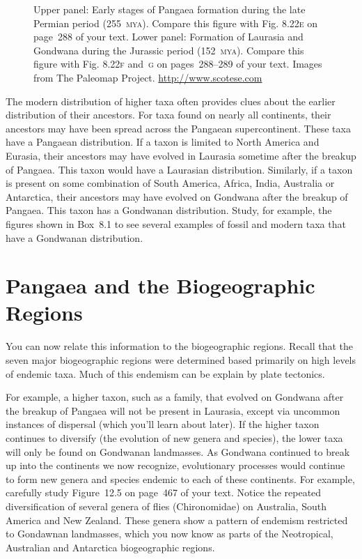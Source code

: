\documentclass[11pt, hidelinks]{article}
\newcommand{\MYA}{\textsc{mya}}
\begin{document}
\begin{figure}[tbp]
	\centering
		\caption{Upper panel: Early stages of Pangaea formation during the late Permian period (255~\MYA). Compare this figure with Fig. 8.22\textsc{e} on page~288 of your text. Lower panel: Formation of Laurasia and Gondwana during the Jurassic period (152~\MYA). Compare this figure with Fig. 8.22\textsc{f} and~\textsc{g} on pages~288–289 of your text. Images from The Paleomap Project. \url{http://www.scotese.com} \label{Pangaea}}
		
\end{figure}

The modern distribution of higher taxa often provides clues about the earlier distribution of their ancestors. For taxa found on nearly all continents, their ancestors may have been spread across the Pangaean supercontinent. These taxa have a Pangaean distribution. If a taxon is limited to North America and Eurasia, their ancestors may have evolved in Laurasia sometime after the breakup of Pangaea. This taxon would have a Laurasian distribution. Similarly, if a taxon is present on some combination of South America, Africa, India, Australia or Antarctica, their ancestors may have evolved on Gondwana after the breakup of Pangaea. This taxon has a Gondwanan distribution. Study, for example, the figures shown in Box~8.1 to see several examples of fossil and modern taxa that have a Gondwanan distribution. 

\section{Pangaea and the Biogeographic Regions}

You can now relate this information to the biogeographic regions. Recall that the seven major biogeographic regions were determined based primarily on high levels of endemic taxa. Much of this endemism can be explain by plate tectonics. 

For example, a higher taxon, such as a family, that evolved on Gondwana after the breakup of Pangaea will not be present in Laurasia, except via uncommon instances of dispersal (which you'll learn about later). If the higher taxon continues to diversify (the evolution of new genera and species), the lower taxa will only be found on Gondwanan landmasses. As Gondwana continued to break up into the continents we now recognize, evolutionary processes would continue to form new genera and species endemic to each of these continents. For example, carefully study Figure~12.5 on page~467 of your text. Notice the repeated diversification of several genera of flies (Chironomidae) on Australia, South America and New Zealand. These genera show a pattern of endemism restricted to Gondawnan landmasses, which you  now know as parts of the Neotropical, Australian and Antarctica biogeographic regions.
\end{document}
